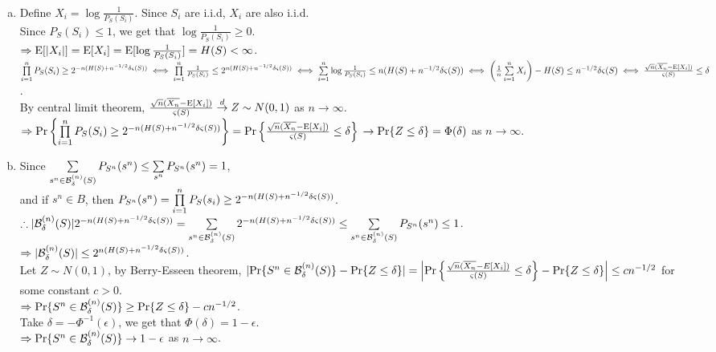 \begin{pr}$ $

\begin{enumerate}[(a)]

\item Define $X_i=\log\frac1{P_S(S_i)}$. Since $S_i$ are i.i.d, $X_i$ are also i.i.d.\\
Since $P_S(S_i)\leq1$, we get that $\log\frac1{P_S(S_i)}\geq0$.\\
$\Rightarrow\mathrm{E}[|X_i|]=\mathrm{E}[X_i]=\mathrm{E}[\log\frac1{P_S(S_i)}]=H(S)<\infty$.\\
$\prod\limits_{i=1}^nP_S(S_i)\geq2^{-n(H(S)+n^{-1/2}\delta\varsigma(S))}\\
\iff\prod\limits_{i=1}^n\frac1{P_S(S_i)}\leq2^{n(H(S)+n^{-1/2}\delta\varsigma(S))}\\
\iff\sum\limits_{i=1}^n\log\frac1{P_S(S_i)}\leq n(H(S)+n^{-1/2}\delta\varsigma(S))\\
\iff\left(\frac1n\sum\limits_{i=1}^nX_i\right)-H(S)\leq n^{-1/2}\delta\varsigma(S)\\
\iff\frac{\sqrt n(\overline{X_n}-\mathrm{E}[X_i])}{\varsigma(S)}\leq\delta$.\\
By central limit theorem, $\frac{\sqrt n(\overline{X_n}-\mathrm{E}[X_i])}{\varsigma(S)}\overset{d}\to Z\sim N(0, 1)$ as $n\to\infty$.\\
$\Rightarrow\mathrm{Pr}\left\{\prod\limits_{i=1}^nP_S(S_i)\geq2^{-n(H(S)+n^{-1/2}\delta\varsigma(S))}\right\}=\mathrm{Pr}\left\{\frac{\sqrt n(\overline{X_n}-\mathrm{E}[X_i])}{\varsigma(S)}\leq\delta\right\}\\\to\mathrm{Pr}\{Z\leq\delta\}=\Phi(\delta)$ as $n\to\infty$.

\renewcommand{\B}{{\mathcal{B}_\delta^{(n)}(S)}}
\newcommand{\cst}{{n(H(S)+n^{-1/2}\delta\varsigma(S))}}
\item %
Since $\suml_{s^n\in\B}P_{S^n}(s^n)\leq\suml_{s^n}P_{S^n}(s^n)=1$,\\
and if $s^n\in B$, then $P_{S^n}(s^n)=\prodl_{i=1}^nP_S(s_i)\geq2^{-\cst}$.\\
$\so|\B|2^{-\cst}=\suml_{s^n\in\B}2^{-\cst}\leq\suml_{s^n\in\B}P_{S^n}(s^n)\leq1$.\\
$\then|\B|\leq2^\cst$.\\
Let $Z\sim N(0, 1)$, by Berry-Esseen theorem, $|\P\{S^n\in\B\}-\P\{Z\leq\delta\}|=\left|\P\left\{\frac{\sqrt n(\overline{X_n}-E[X_i])}{\varsigma(S)}\leq\delta\right\}-\P\{Z\leq\delta\}\right|\leq cn^{-1/2}$ for some constant $c>0$.\\
$\then\P\{S^n\in\B\}\geq\P\{Z\leq\delta\}-cn^{-1/2}$.\\
Take $\delta=-\Phi^{-1}(\epsilon)$, we get that $\Phi(\delta)=1-\epsilon$.\\
$\then\P\{S^n\in\B\}\to1-\epsilon$ as $n\to\infty$.\\

\end{enumerate}

\end{pr}
